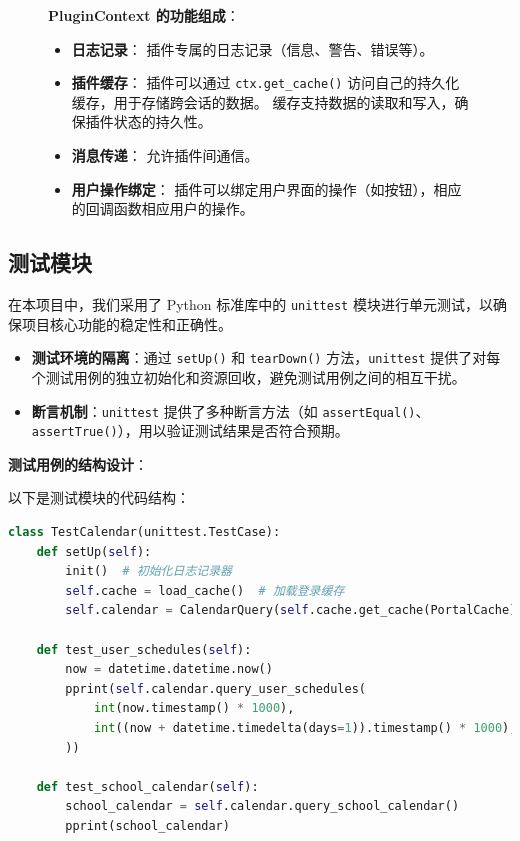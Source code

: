 \documentclass[14pt,a4paper,UTF8,twoside]{article}
\begin{document}
\begin{figure}[H]
{\begin{minipage}[H]{0.4\textwidth}
\begin{tikzpicture}
                \end{tikzpicture}
            \end{minipage}
            \hspace{2.5cm}
            \begin{minipage}[H]{0.6\textwidth}
                \textbf{PluginContext 的功能组成}：
                \begin{itemize}
                    \item \textbf{日志记录}：
                    插件专属的日志记录（信息、警告、错误等）。
                    \item \textbf{插件缓存}：
                    插件可以通过 \texttt{ctx.get\_cache()} 访问自己的持久化缓存，用于存储跨会话的数据。
                    缓存支持数据的读取和写入，确保插件状态的持久性。
                    \item \textbf{消息传递}：
                    允许插件间通信。
                    \item \textbf{用户操作绑定}：
                    插件可以绑定用户界面的操作（如按钮），相应的回调函数相应用户的操作。
                \end{itemize}
            \end{minipage}
        }
    \end{figure}

    \subsection{测试模块}

    在本项目中，我们采用了 Python 标准库中的 \texttt{unittest} 模块进行单元测试，以确保项目核心功能的稳定性和正确性。

    \begin{itemize}
        \item \textbf{测试环境的隔离}：通过 \texttt{setUp()} 和 \texttt{tearDown()} 方法，\texttt{unittest} 提供了对每个测试用例的独立初始化和资源回收，避免测试用例之间的相互干扰。
        \item \textbf{断言机制}：\texttt{unittest} 提供了多种断言方法（如 \texttt{assertEqual()}、\texttt{assertTrue()}），用以验证测试结果是否符合预期。
    \end{itemize}

    \textbf{测试用例的结构设计}：

    以下是测试模块的代码结构：
    \begin{lstlisting}[language=Python]
class TestCalendar(unittest.TestCase):
    def setUp(self):
        init()  # 初始化日志记录器
        self.cache = load_cache()  # 加载登录缓存
        self.calendar = CalendarQuery(self.cache.get_cache(PortalCache))

    def test_user_schedules(self):
        now = datetime.datetime.now()
        pprint(self.calendar.query_user_schedules(
            int(now.timestamp() * 1000),
            int((now + datetime.timedelta(days=1)).timestamp() * 1000),
        ))

    def test_school_calendar(self):
        school_calendar = self.calendar.query_school_calendar()
        pprint(school_calendar)
    \end{lstlisting}
\end{document}
